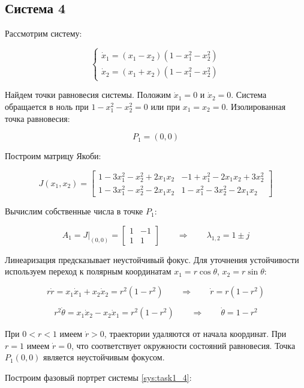 \documentclass[a4paper,12pt]{article}
\begin{document}
\subsection{Система 4}

Рассмотрим систему:

\begin{equation} \label{sys:task1_4}
	\begin{cases}
		\dot{x}_1 = (x_1 - x_2)(1 - x_1^2 - x_2^2) \\
		\dot{x}_2 = (x_1 + x_2)(1 - x_1^2 - x_2^2)
	\end{cases}
\end{equation}

Найдем точки равновесия системы. Положим \(\dot{x}_1 = 0 \text{ и } \dot{x}_2 = 0\). Система обращается в ноль при \(1 - x_1^2 - x_2^2 = 0\) или при \(x_1 = x_2 = 0\). Изолированная точка равновесия:

\[
P_1 = (0, 0)
\]

Построим матрицу Якоби:

\[
J(x_1, x_2) = 
\begin{bmatrix}
	1 - 3x_1^2 - x_2^2 + 2x_1x_2 & -1 + x_1^2 - 2x_1x_2 + 3x_2^2 \\[6pt]
	1 - 3x_1^2 - x_2^2 - 2x_1x_2 & 1 - x_1^2 - 3x_2^2 - 2x_1x_2
\end{bmatrix}
\]

Вычислим собственные числа в точке \(P_1\):

\[
A_1 = J|_{(0,0)} = \begin{bmatrix} 1 & -1 \\ 1 & 1 \end{bmatrix}
\qquad \Longrightarrow \qquad
\lambda_{1,2} = 1 \pm j
\]

Линеаризация предсказывает неустойчивый фокус. Для уточнения устойчивости используем переход к полярным координатам \(x_1 = r \cos \theta\), \(x_2 = r \sin \theta\):

\[
r \dot{r} = x_1 \dot{x}_1 + x_2 \dot{x}_2 = r^2(1 - r^2)
\qquad \Longrightarrow \qquad
\dot{r} = r(1 - r^2)
\]

\[
r^2 \dot{\theta} = x_1 \dot{x}_2 - x_2 \dot{x}_1 = r^2(1 - r^2)
\qquad \Longrightarrow \qquad
\dot{\theta} = 1 - r^2
\]

При \(0 < r < 1\) имеем \(\dot{r} > 0\), траектории удаляются от начала координат. При \(r = 1\) имеем \(\dot{r} = 0\), что соответствует окружности состояний равновесия. Точка \(P_1(0,0)\) является неустойчивым фокусом.

Построим фазовый портрет системы \eqref{sys:task1_4}:
\end{document}
